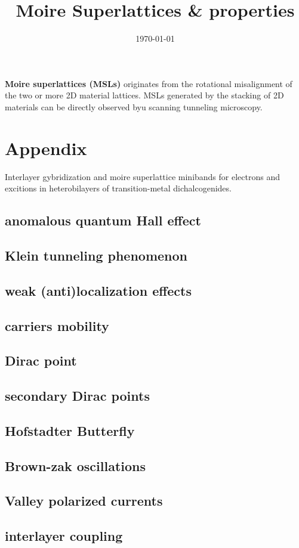 \documentclass[a4paper, 11pt]{article}
\title{ Moire Superlattices \& properties}
\date{\today}
\numberwithin{equation}{subsection}
\begin{document}
\maketitle
\tableofcontents

\textbf{Moire superlattices (MSLs)} originates from the rotational misalignment of the two or more 2D material lattices. MSLs generated by the stacking of 2D materials can be directly observed byu scanning tunneling microscopy.








\section{Appendix}


Interlayer gybridization and moire superlattice minibands for electrons and excitions in heterobilayers of transition-metal dichalcogenides.


\subsection{anomalous quantum Hall effect}

\subsection{Klein tunneling phenomenon}

\subsection{weak (anti)localization effects}

\subsection{carriers mobility}

\subsection{Dirac point}


\subsection{secondary Dirac points}

\subsection{Hofstadter Butterfly}

\subsection{Brown-zak oscillations}

\subsection{Valley polarized currents}

\subsection{interlayer coupling}



\newpage
%
\end{document}
